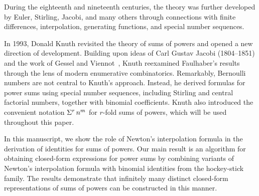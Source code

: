 During the eighteenth and nineteenth centuries,
the theory was further developed by Euler, Stirling, Jacobi,
and many others through connections with finite differences,
interpolation, generating functions, and special number sequences.

In 1993, Donald Knuth revisited the theory of sums of powers
and opened a new direction of development.
Building upon ideas of Carl Gustav Jacobi (1804--1851)
and the work of Gessel and Viennot~\cite[(1989)]{gessel1989determinants},
Knuth reexamined Faulhaber's results through the lens of modern
enumerative combinatorics.
Remarkably, Bernoulli numbers are not central to Knuth's approach.
Instead, he derived formulas for power sums using
special number sequences, including Stirling and central factorial numbers,
together with binomial coefficients.
Knuth also introduced the convenient notation
$\Sigma^{r}\,{n}^{m}$ for $r$-fold sums of powers,
which will be used throughout this paper.

In this manuscript, we show the role of Newton's interpolation formula
in the derivation of identities for sums of powers.
Our main result is an algorithm for obtaining closed-form expressions
for power sums by combining variants of Newton's interpolation formula
with binomial identities from the hockey-stick family.
The results demonstrate that infinitely many distinct closed-form representations
of sums of powers can be constructed in this manner.
